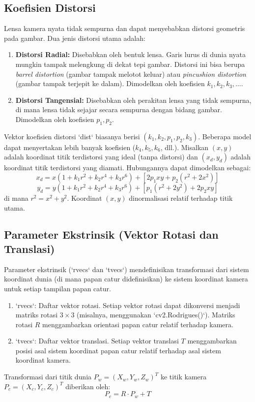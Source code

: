 \documentclass[12pt,a4paper]{article}
\begin{document}
\subsection{Koefisien Distorsi}
Lensa kamera nyata tidak sempurna dan dapat menyebabkan distorsi geometris pada
gambar. Dua jenis distorsi utama adalah:
\begin{enumerate}[label=\alph*.]
    \item \textbf{Distorsi Radial:} Disebabkan oleh bentuk lensa. Garis lurus di dunia nyata mungkin tampak melengkung di dekat tepi gambar. Distorsi ini bisa berupa \textit{barrel distortion} (gambar tampak melotot keluar) atau \textit{pincushion distortion} (gambar tampak terjepit ke dalam). Dimodelkan oleh koefisien $k_1, k_2, k_3, \dots$.
    \item \textbf{Distorsi Tangensial:} Disebabkan oleh perakitan lensa yang tidak sempurna, di mana lensa tidak sejajar secara sempurna dengan bidang gambar. Dimodelkan oleh koefisien $p_1, p_2$.
\end{enumerate}
Vektor koefisien distorsi `dist` biasanya berisi $(k_1, k_2, p_1, p_2, k_3)$. Beberapa model dapat menyertakan lebih banyak koefisien ($k_4, k_5, k_6$, dll.).
Misalkan $(x, y)$ adalah koordinat titik terdistorsi yang ideal (tanpa distorsi) dan $(x_d, y_d)$ adalah koordinat titik terdistorsi yang diamati. Hubungannya dapat dimodelkan sebagai:
$$ x_d = x(1 + k_1 r^2 + k_2 r^4 + k_3 r^6) + [2 p_1 xy + p_2(r^2 + 2x^2)] $$
$$ y_d = y(1 + k_1 r^2 + k_2 r^4 + k_3 r^6) + [p_1(r^2 + 2y^2) + 2 p_2 xy] $$
di mana $r^2 = x^2 + y^2$. Koordinat $(x,y)$ dinormalisasi relatif terhadap titik utama.

\subsection{Parameter Ekstrinsik (Vektor Rotasi dan Translasi)}
Parameter ekstrinsik (`rvecs` dan `tvecs`) mendefinisikan transformasi dari
sistem koordinat dunia (di mana papan catur didefinisikan) ke sistem koordinat
kamera untuk setiap tampilan papan catur.
\begin{enumerate}[label=\alph*.]
    \item `rvecs`: Daftar vektor rotasi. Setiap vektor rotasi dapat dikonversi menjadi matriks rotasi $3 \times 3$ (misalnya, menggunakan `cv2.Rodrigues()`). Matriks rotasi $R$ menggambarkan orientasi papan catur relatif terhadap kamera.
    \item `tvecs`: Daftar vektor translasi. Setiap vektor translasi $T$ menggambarkan posisi asal sistem koordinat papan catur relatif terhadap asal sistem koordinat kamera.
\end{enumerate}
Transformasi dari titik dunia $P_w = (X_w, Y_w, Z_w)^T$ ke titik kamera $P_c = (X_c, Y_c, Z_c)^T$ diberikan oleh:
$$ P_c = R \cdot P_w + T $$
\end{document}
